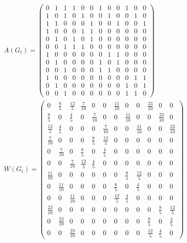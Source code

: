 {\begin{gather*}
	A(G_t)=\left(\begin{array}{cccccccccccc} 0 & 1 & 1 & 1 & 0 & 0 & 1 & 0 & 0 & 1 & 0 & 0\\ 1 & 0 & 1 & 0 & 1 & 0 & 0 & 1 & 0 & 0 & 1 & 0\\ 1 & 1 & 0 & 0 & 0 & 1 & 0 & 0 & 1 & 0 & 0 & 1\\ 1 & 0 & 0 & 0 & 1 & 1 & 0 & 0 & 0 & 0 & 0 & 0\\ 0 & 1 & 0 & 1 & 0 & 1 & 0 & 0 & 0 & 0 & 0 & 0\\ 0 & 0 & 1 & 1 & 1 & 0 & 0 & 0 & 0 & 0 & 0 & 0\\ 1 & 0 & 0 & 0 & 0 & 0 & 0 & 1 & 1 & 0 & 0 & 0\\ 0 & 1 & 0 & 0 & 0 & 0 & 1 & 0 & 1 & 0 & 0 & 0\\ 0 & 0 & 1 & 0 & 0 & 0 & 1 & 1 & 0 & 0 & 0 & 0\\ 1 & 0 & 0 & 0 & 0 & 0 & 0 & 0 & 0 & 0 & 1 & 1\\ 0 & 1 & 0 & 0 & 0 & 0 & 0 & 0 & 0 & 1 & 0 & 1\\ 0 & 0 & 1 & 0 & 0 & 0 & 0 & 0 & 0 & 1 & 1 & 0 \end{array}\right) \\
	W(G_t)=\left(\begin{array}{cccccccccccc} 0 & \frac{8}{5} & \frac{12}{5} & \frac{7}{10} & 0 & 0 & \frac{11}{10} & 0 & 0 & \frac{23}{10} & 0 & 0\\ \frac{8}{5} & 0 & \frac{4}{5} & 0 & \frac{7}{10} & 0 & 0 & \frac{11}{10} & 0 & 0 & \frac{23}{10} & 0\\ \frac{12}{5} & \frac{4}{5} & 0 & 0 & 0 & \frac{7}{10} & 0 & 0 & \frac{11}{10} & 0 & 0 & \frac{23}{10}\\ \frac{7}{10} & 0 & 0 & 0 & \frac{8}{5} & \frac{12}{5} & 0 & 0 & 0 & 0 & 0 & 0\\ 0 & \frac{7}{10} & 0 & \frac{8}{5} & 0 & \frac{4}{5} & 0 & 0 & 0 & 0 & 0 & 0\\ 0 & 0 & \frac{7}{10} & \frac{12}{5} & \frac{4}{5} & 0 & 0 & 0 & 0 & 0 & 0 & 0\\ \frac{11}{10} & 0 & 0 & 0 & 0 & 0 & 0 & \frac{8}{5} & \frac{12}{5} & 0 & 0 & 0\\ 0 & \frac{11}{10} & 0 & 0 & 0 & 0 & \frac{8}{5} & 0 & \frac{4}{5} & 0 & 0 & 0\\ 0 & 0 & \frac{11}{10} & 0 & 0 & 0 & \frac{12}{5} & \frac{4}{5} & 0 & 0 & 0 & 0\\ \frac{23}{10} & 0 & 0 & 0 & 0 & 0 & 0 & 0 & 0 & 0 & \frac{8}{5} & \frac{12}{5}\\ 0 & \frac{23}{10} & 0 & 0 & 0 & 0 & 0 & 0 & 0 & \frac{8}{5} & 0 & \frac{4}{5}\\ 0 & 0 & \frac{23}{10} & 0 & 0 & 0 & 0 & 0 & 0 & \frac{12}{5} & \frac{4}{5} & 0 \end{array}\right)
\end{gather*}
}

